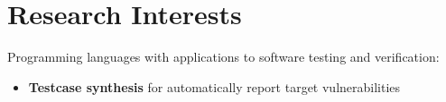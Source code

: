\section{Research Interests}
Programming languages with applications to software testing and verification:

\renewcommand{\labelitemi}{$\blacktriangleright$}
\addtolength{\leftmargini}{0.3cm}

\begin{itemize}
\vspace{2mm}
\item \textbf{Testcase synthesis} for automatically report target vulnerabilities
\end{itemize}

\vspace{9mm}
